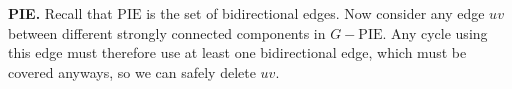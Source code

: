 \textbf{PIE.} Recall that $\text{PIE}$ is the set of bidirectional edges. Now consider any edge $uv$ between different strongly connected components in $G - \text{PIE}$. Any cycle using this edge must therefore use at least one bidirectional edge, which must be covered anyways, so we can safely delete $uv$.